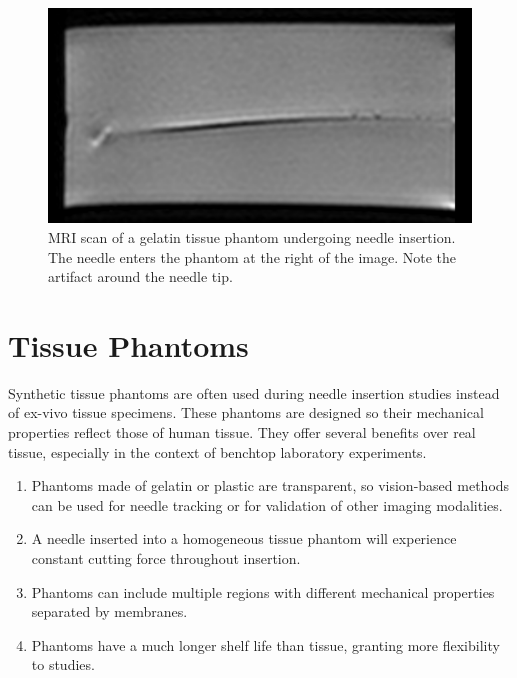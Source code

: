 \begin{figure}[h]
\includegraphics[width=1.0\textwidth]{Fig/chap1/mri_phantom.png}
\caption{MRI scan of a gelatin tissue phantom undergoing needle insertion. The needle enters the phantom at the right of the image. Note the artifact around the needle tip.}
\label{fig:mri_phantom}
\end{figure}


\section{Tissue Phantoms}
Synthetic tissue phantoms are often used during needle insertion studies instead of ex-vivo tissue specimens. These phantoms are designed so their mechanical properties reflect those of human tissue. They offer several benefits over real tissue, especially in the context of benchtop laboratory experiments.
\begin{enumerate}
\item Phantoms made of gelatin or plastic are transparent, so vision-based methods can be used for needle tracking or for validation of other imaging modalities.

\item A needle inserted into a homogeneous tissue phantom will experience constant cutting force throughout insertion.

\item Phantoms can include multiple regions with different mechanical properties separated by membranes.

\item Phantoms have a much longer shelf life than tissue, granting more flexibility to studies.
\end{enumerate}


